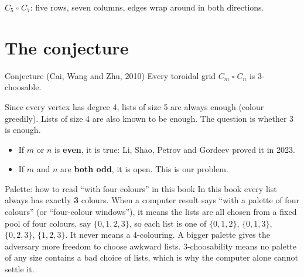 \documentclass[11pt,oneside,openany]{book}
\newcommand{\T}{\mathbin{\square}}
\begin{document}
\begin{center}

{\small $C_5 \T C_7$: five rows, seven columns, edges wrap around in both directions.}
\end{center}

\section{The conjecture}

\begin{definitionbox}{Conjecture (Cai, Wang and Zhu, 2010)}
Every toroidal grid $C_m \T C_n$ is 3-choosable.
\end{definitionbox}

Since every vertex has degree 4, lists of size 5 are always enough (colour greedily). Lists of
size 4 are also known to be enough. The question is whether 3 is enough.

\begin{itemize}
\item If $m$ or $n$ is \textbf{even}, it is true: Li, Shao, Petrov and Gordeev proved it in 2023.
\item If $m$ and $n$ are \textbf{both odd}, it is open. This is our problem.
\end{itemize}

\begin{definitionbox}{Palette: how to read ``with four colours'' in this book}
In this book every list always has exactly \textbf{3} colours. When a computer result says
``with a palette of four colours'' (or ``four-colour windows''), it means the lists are all chosen
from a fixed pool of four colours, say $\{0,1,2,3\}$, so each list is one of $\{0,1,2\}$,
$\{0,1,3\}$, $\{0,2,3\}$, $\{1,2,3\}$. It never means a 4-colouring. A bigger palette gives the
adversary more freedom to choose awkward lists. 3-choosability means no palette of any size
contains a bad choice of lists, which is why the computer alone cannot settle it.
\end{definitionbox}
\end{document}
